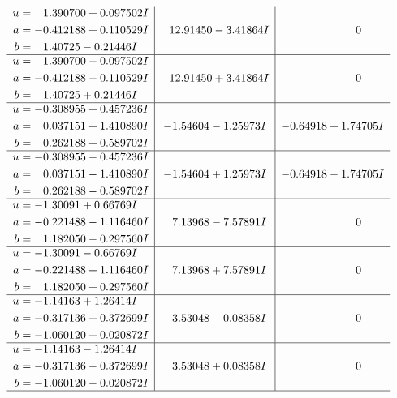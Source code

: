 \documentclass[1p]{elsarticle_modified}
\theoremstyle{definition}
\begin{document}
$$\begin{array}{c|c|c}
\begin{aligned}
u &= \phantom{-}1.390700 + 0.097502 I \\
a &= -0.412188 + 0.110529 I \\
b &= \phantom{-}1.40725 - 0.21446 I\end{aligned}
 & \phantom{-}12.91450 - 3.41864 I & \phantom{-0.000000 } 0 \\ \hline\begin{aligned}
u &= \phantom{-}1.390700 - 0.097502 I \\
a &= -0.412188 - 0.110529 I \\
b &= \phantom{-}1.40725 + 0.21446 I\end{aligned}
 & \phantom{-}12.91450 + 3.41864 I & \phantom{-0.000000 } 0 \\ \hline\begin{aligned}
u &= -0.308955 + 0.457236 I \\
a &= \phantom{-}0.037151 + 1.410890 I \\
b &= \phantom{-}0.262188 + 0.589702 I\end{aligned}
 & -1.54604 - 1.25973 I & -0.64918 + 1.74705 I \\ \hline\begin{aligned}
u &= -0.308955 - 0.457236 I \\
a &= \phantom{-}0.037151 - 1.410890 I \\
b &= \phantom{-}0.262188 - 0.589702 I\end{aligned}
 & -1.54604 + 1.25973 I & -0.64918 - 1.74705 I \\ \hline\begin{aligned}
u &= -1.30091 + 0.66769 I \\
a &= -0.221488 - 1.116460 I \\
b &= \phantom{-}1.182050 - 0.297560 I\end{aligned}
 & \phantom{-}7.13968 - 7.57891 I & \phantom{-0.000000 } 0 \\ \hline\begin{aligned}
u &= -1.30091 - 0.66769 I \\
a &= -0.221488 + 1.116460 I \\
b &= \phantom{-}1.182050 + 0.297560 I\end{aligned}
 & \phantom{-}7.13968 + 7.57891 I & \phantom{-0.000000 } 0 \\ \hline\begin{aligned}
u &= -1.14163 + 1.26414 I \\
a &= -0.317136 + 0.372699 I \\
b &= -1.060120 + 0.020872 I\end{aligned}
 & \phantom{-}3.53048 - 0.08358 I & \phantom{-0.000000 } 0 \\ \hline\begin{aligned}
u &= -1.14163 - 1.26414 I \\
a &= -0.317136 - 0.372699 I \\
b &= -1.060120 - 0.020872 I\end{aligned}
 & \phantom{-}3.53048 + 0.08358 I & \phantom{-0.000000 } 0\\
 \hline 
 \end{array}$$\newpage\newpage\renewcommand{\arraystretch}{1}
\end{document}

